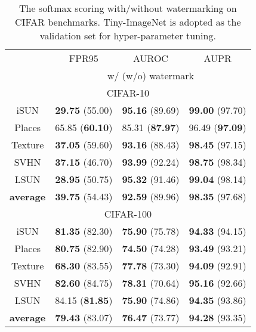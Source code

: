 \documentclass{article}
\begin{document}
\begin{table}[t]
\centering
\caption{The softmax scoring with/without watermarking on CIFAR benchmarks. Tiny-ImageNet is adopted as the validation set for hyper-parameter tuning.} \label{tablast}
\vspace{5pt}
\scriptsize
{
\begin{tabular}{c|ccc}
\toprule[1.5pt]
                   & FPR95      & AUROC        & AUPR       \\
                   \cline{2-4} 
\multirow{-2}{*}{} & \multicolumn{3}{c}{w/ (w/o) watermark} \\
\midrule[0.6pt]
\multicolumn{4}{c}{\cellcolor{greyL}CIFAR-10} \\
\midrule[0.6pt]
iSUN               & \textbf{29.75} (55.00)& \textbf{95.16} (89.69)& \textbf{99.00} (97.70)\\
Places        & 65.85 (\textbf{60.10})& 85.31 (\textbf{87.97})& 96.49 (\textbf{97.09})\\
Texture            & \textbf{37.05} (59.60)& \textbf{93.16} (88.43)& \textbf{98.45} (97.15)\\
SVHN               & \textbf{37.15} (46.70)& \textbf{93.99} (92.24)& \textbf{98.75} (98.34)\\
LSUN               & \textbf{28.95} (50.75)& \textbf{95.32} (91.46)& \textbf{99.04} (98.14)\\
\midrule
\textbf{average}   & \textbf{39.75} (54.43)& \textbf{92.59} (89.96)& \textbf{98.35} (97.68)\\ \midrule[1pt]
\multicolumn{4}{c}{\cellcolor{greyL}CIFAR-100} \\
\midrule[1pt]
iSUN               & \textbf{81.35} (82.30)& \textbf{75.90} (75.78)& \textbf{94.33} (94.15)\\ 
Places        & \textbf{80.75} (82.90)& \textbf{74.50} (74.28)& \textbf{93.49} (93.21)\\
Texture            & \textbf{68.30} (83.55)& \textbf{77.78} (73.30)& \textbf{94.09} (92.91)\\
SVHN               & \textbf{82.60} (84.75)& \textbf{78.31} (70.64)& \textbf{95.16} (92.66)\\
LSUN               & 84.15 (\textbf{81.85})& \textbf{75.90} (74.86)& \textbf{94.35} (93.86)\\
\midrule
\textbf{average}   & \textbf{79.43} (83.07)  & \textbf{76.47} (73.77)     & \textbf{94.28} (93.35)             \\ \bottomrule[1.5pt]      
\end{tabular}
}
\end{table}
\end{document}
